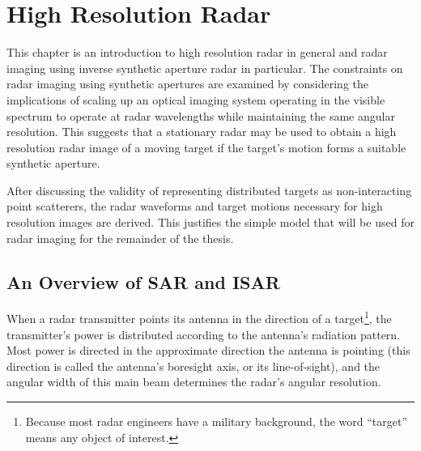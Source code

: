 %
%
%
%
%
%
%

\chapter{High Resolution Radar}
\label{hrr chp}

\bigletter This chapter is an introduction to high resolution radar in
general and radar imaging using inverse synthetic aperture radar in
particular.  The constraints on radar imaging using synthetic apertures are
examined by considering the implications of scaling up an optical imaging
system operating in the visible spectrum to operate at radar wavelengths
while maintaining the same angular resolution.  This suggests that a
stationary radar may be used to obtain a high resolution radar image of a
moving target if the target's motion forms a suitable synthetic aperture.

After discussing the validity of representing distributed targets as
non-interacting point scatterers, the radar waveforms and target motions
necessary for high resolution images are derived.  This justifies the simple
model that will be used for radar imaging for the remainder of the thesis.


\section{An Overview of SAR and ISAR}


When a radar transmitter points its antenna in the direction of a 
target\footnote{Because most radar engineers have a military background, the
word ``target'' means any object of interest.}, the transmitter's power is
distributed according to the antenna's radiation pattern.  Most power is
directed in the approximate direction the antenna is pointing (this
direction is called the antenna's boresight axis, or its line-of-sight), and
the angular width of this main beam determines the radar's angular
resolution.

